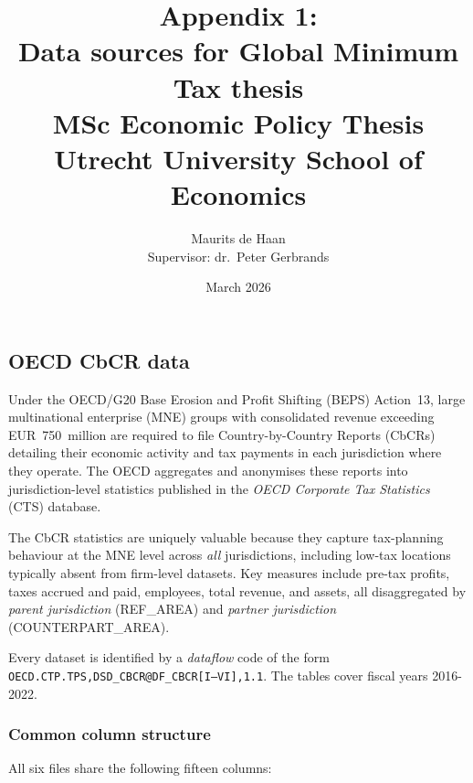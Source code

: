 \documentclass[11pt,a4paper]{article}
\title{\textbf{Appendix 1:\\ Data sources for Global Minimum Tax thesis}\\[0.5em]
\large MSc Economic Policy Thesis\\Utrecht University School of Economics}
\author{Maurits de Haan\\[0.3em]
\small Supervisor: dr.\ Peter Gerbrands}
\date{March 2026}
\newcommand{\code}[1]{\texttt{#1}}
\begin{document}
\maketitle

\newpage
\tableofcontents
\newpage

\subsection{OECD CbCR data}

Under the OECD/G20 Base Erosion and Profit Shifting (BEPS) Action~13, large multinational enterprise (MNE) groups with consolidated revenue exceeding EUR~750~million are required to file Country-by-Country Reports (CbCRs) detailing their economic activity and tax payments in each jurisdiction where they operate. The OECD aggregates and anonymises these reports into jurisdiction-level statistics published in the \emph{OECD Corporate Tax Statistics} (CTS) database.

The CbCR statistics are uniquely valuable because they capture tax-planning behaviour at the MNE level across \emph{all} jurisdictions, including low-tax locations typically absent from firm-level datasets. Key measures include pre-tax profits, taxes accrued and paid, employees, total revenue, and assets, all disaggregated by \emph{parent jurisdiction} (REF\_AREA) and \emph{partner jurisdiction} (COUNTERPART\_AREA).

Every dataset is identified by a \emph{dataflow} code of the form \code{OECD.CTP.TPS,DSD\_CBCR@DF\_CBCR[I--VI],1.1}. The tables cover fiscal years 2016-2022.

\subsubsection{Common column structure}

All six files share the following fifteen columns:
\end{document}
